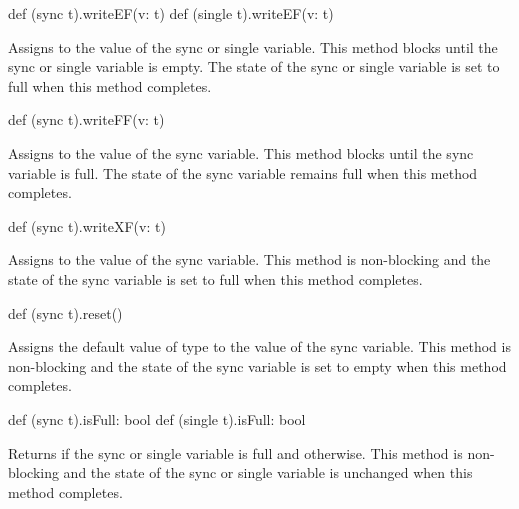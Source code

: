 \begin{protohead}
def (sync t).writeEF(v: t)
def (single t).writeEF(v: t)
\end{protohead}
\begin{protobody}
Assigns  to the value of the sync or single variable.  This
method blocks until the sync or single variable is empty.  The state
of the sync or single variable is set to full when this method
completes.
\end{protobody}

\begin{protohead}
def (sync t).writeFF(v: t)
\end{protohead}
\begin{protobody}
Assigns  to the value of the sync variable.  This method
blocks until the sync variable is full.  The state of the sync
variable remains full when this method completes.
\end{protobody}

\begin{protohead}
def (sync t).writeXF(v: t)
\end{protohead}
\begin{protobody}
Assigns  to the value of the sync variable.  This method is
non-blocking and the state of the sync variable is set to full when
this method completes.
\end{protobody}

\begin{protohead}
def (sync t).reset()
\end{protohead}
\begin{protobody}
Assigns the default value of type  to the value of the sync
variable.  This method is non-blocking and the state of the sync
variable is set to empty when this method completes.
\end{protobody}

\begin{protohead}
def (sync t).isFull: bool
def (single t).isFull: bool
\end{protohead}
\begin{protobody}
Returns  if the sync or single variable is full and 
otherwise.  This method is non-blocking and the state of the sync or single
variable is unchanged when this method completes.
\end{protobody}

